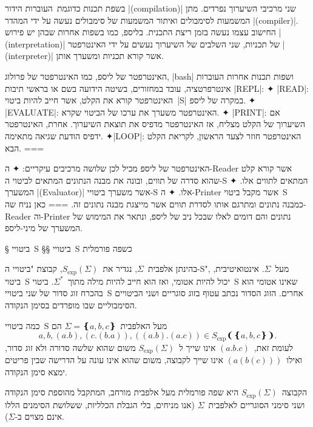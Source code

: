בשפת תכנות כדוגמת~\CPL העוברות הידור \E|(compilation)| שני מרכיבי השיערוך
נפרדים. מתן המשמעות לסימבולים ואיתור המשמעות של סימבולים נעשה על ידי המהדר
\E|(compiler)|. החישוב עצמו נעשה בזמן ריצת התכנית. בליספ, כמו בשפות אחרות שבהן
יש פירוש \E|(interpretation)| של תכניות, שני השלבים של השיערוך נעשים על ידי
האינטרפטר \E|(interpreter)| אשר קורא תכניות ומשערך אותן.

\begin{minipage}\linewidth
  \begin{mdframed}[backgroundcolor=Lavender!20]
    האינטרפטר של ליספ, כמו האינטרפטר של פרולוג, \E|bash| ושפות תכנות אחרות העוברות
    אינטרפרטציה, עובד במחזורים, בשיטה הידועה בשם
    או בראשי תיבות \E|REPL|:
    ✦ \E|READ|: האינטרפטר קורא את הקלט, אשר חייב להיות ביטוי~\E|S| במקרה של ליספ.
    ✦ \E|EVALUATE|: האינטרפטר משערך את ערכו של הביטוי שקרא.
    ✦ \E|PRINT|: אם השיערוך של הקלט מצליח, אז האינטרפטר מדפיס את תוצאת השיערוך.
    אחרת, האינטרפטר ידפיס הודעת שגיאה מתאימה.
    ✦\E|LOOP|: האינטרפטר חוזר לצעד הראשון, לקריאת הקלט הבא.
    ===
  \end{mdframed}
\end{minipage}

\normalsize

האינטרפטר של ליספ מכיל לכן שלושה מרכיבים עיקריים:
✦ ה-Reader אשר קורא קלט שהוא סדרה של תווים, ובונה את מבנה הנתונים המתאים
לביטוי ה-S המתאים לתווים אלו.
✦ המשערך \E|(Evaluator)| אשר משערך ביטויי-S אלו.
✦ ה-Printer אשר מקבל ביטוי~S כמבנה נתונים ומתרגם אותו לסדרת תווים אשר
מייצגת מבנה נתונים זה.
===
כאן נניח שה-Reader וה-Printer נתונים והם דומים לאלו שבכל ניב של ליספ, ונתאר את
המימוש של המשערך של מיני-ליספ.

§ ביטויי~S
§§ ביטויי~S כשפה פורמלית

\newcommand\SX{\ensuremath{S_{\text{exp}}}}

בהינתן אלפבית~$Σ$, נגדיר את~$\SX(Σ)$, קבוצת "ביטויי ה-S", מעל~$Σ$.
אינטואיטיבית, ביטוי~S יכול להיות אטומי, ואז הוא חייב להיות מילה מתוך~$Σ^*$.
ביטוי~S שאינו אטומי הוא בהכרח זוג סדור של שני ביטויי~S אחרים. הזוג הסדור נכתב
עטוף בזוג סוגריים ושני הביטויים הסימבוליים שבו מופרדים בסימן הנקודה.

כמה ביטויי~S מעל האלפבית~$Σ=❴a,b,c❵$ הם \[
  a,b,(a.b),(c.(b.a)),((a.b).(a.c))∈\SX❨❴a,b,c❵❩.
\] לעומת זאת,~$(a.b.c)$ אינו שייך ל~$\SX(Σ)$ משום שהוא שלשה סדורה ולא זוג סדור,
ואילו~$(a(b(c)))$ אינו שייך לקבוצה, משום שהוא אינו עונה על הדרישה שבין פריטים
ימצא סימן הנקודה.

הקבוצה~$\SX(Σ)$ היא שפה פורמלית מעל אלפבית מורחב, המתקבל מהוספת סימן הנקודה
ושני סימני הסוגריים לאלפבית~$Σ$ (אנו מניחים, בלי הגבלת הכלליות, ששלושת הסימנים
הללו אינם מצוים ב-$Σ$).

